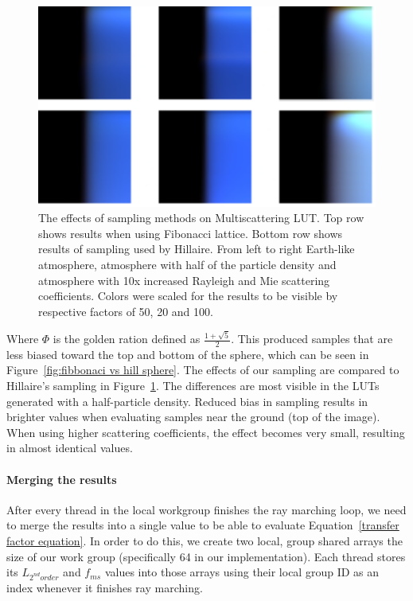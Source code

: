 \documentclass{ctuthesis}
\begin{document}
\begin{figure}
        \includegraphics[width=1.0\textwidth]{media/sphere_sampling_multiscattering_comparison.png}
        \caption[Sampling effect methods]{The effects of sampling methods on Multiscattering LUT. Top row shows results when using
            Fibonacci lattice. Bottom row shows results of sampling used by Hillaire. From left to right
            Earth-like atmosphere, atmosphere with half of the particle density and atmosphere with 10x increased
            Rayleigh and Mie scattering coefficients. Colors were scaled for the results to be visible by 
            respective factors of 50, 20 and 100.}
        \label{fig:fibbonaci vs hill multiscattering}
\end{figure}
Where $\Phi$ is the golden ration defined as $\frac{1+ \sqrt{5}}{2}$. This produced samples that 
are less biased toward the top and bottom of the sphere, which can be seen in 
Figure~\ref{fig:fibbonaci vs hill sphere}. The effects of our sampling are compared to Hillaire's 
sampling in Figure~\ref{fig:fibbonaci vs hill multiscattering}. The differences are most visible
in the LUTs generated with a half-particle density. Reduced bias in sampling results in brighter values
when evaluating samples near the ground (top of the image). When using higher scattering coefficients,
the effect becomes very small, resulting in almost identical values.

\paragraph{Merging the results}
After every thread in the local workgroup finishes the ray marching loop, we need to merge the results
into a single value to be able to evaluate Equation~\ref{transfer factor equation}. In order
to do this, we create two local, group shared arrays the size of our work group (specifically 64 in our 
implementation). Each thread stores its $L_{2^{nd}order}$ and $f_{ms}$ values into those arrays 
using their local group ID as an index whenever it finishes ray marching.
\end{document}
